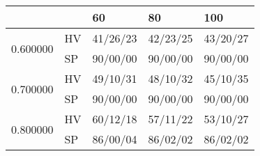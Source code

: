 \begin{tabular}{lllll}
\toprule
 &  & 60 & 80 & 100 \\
\midrule
\multirow[t]{2}{*}{0.600000} & HV & 41/26/23 & 42/23/25 & 43/20/27 \\
 & SP & 90/00/00 & 90/00/00 & 90/00/00 \\
\cline{1-5}
\multirow[t]{2}{*}{0.700000} & HV & 49/10/31 & 48/10/32 & 45/10/35 \\
 & SP & 90/00/00 & 90/00/00 & 90/00/00 \\
\cline{1-5}
\multirow[t]{2}{*}{0.800000} & HV & 60/12/18 & 57/11/22 & 53/10/27 \\
 & SP & 86/00/04 & 86/02/02 & 86/02/02 \\
\cline{1-5}
\bottomrule
\end{tabular}
